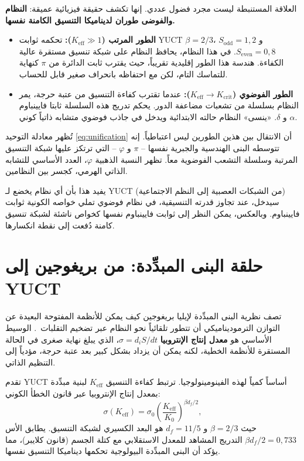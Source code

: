 \documentclass[12pt,a4paper]{article}
\newcommand{\Keff}{K_{\mathrm{eff}}}
\begin{document}
	العلاقة المستنبطة ليست مجرد فضول عددي. إنها تكشف حقيقة فيزيائية عميقة: \textbf{النظام والفوضى طوران لديناميكا التنسيق الكامنة نفسها.}
	
	\begin{itemize}
		\item \textbf{الطور المرتب (\(K_{\mathrm{eff}} \gg 1\)):} تحكمه ثوابت YUCT \(\beta = 2/3\)، \(S_{\mathrm{odd}} = 1{,}2\) و \(S_{\mathrm{even}} = 0{,}8\). في هذا النظام، يحافظ النظام على شبكة تنسيق مستقرة عالية الكفاءة. هندسة هذا الطور إقليدية تقريباً، حيث يقترب ثابت الدائرة من \(\pi\) كنهاية للتماسك التام، لكن مع احتفاظه بانحراف صغير قابل للحساب.
		
		\item \textbf{الطور الفوضوي (\(K_{\mathrm{eff}} \to K_{\mathrm{crit}}\)):} عندما تقترب كفاءة التنسيق من عتبة حرجة، يمر النظام بسلسلة من تشعبات مضاعفة الدور. يحكم تدريج هذه السلسلة ثابتا فايينباوم \(\alpha\) و \(\delta\). «ينسى» النظام حالته الابتدائية ويدخل في جاذب فوضوي متشابه ذاتياً كوني.
	\end{itemize}
	
	تُظهر معادلة التوحيد \eqref{eq:unification} أن الانتقال بين هذين الطورين ليس اعتباطياً. إنه تتوسطه البنى الهندسية والجبرية نفسها – \(\pi\) و \(\varphi\) – التي ترتكز عليها شبكة التنسيق المرتبة وسلسلة التشعب الفوضوية معاً. تظهر النسبة الذهبية \(\varphi\)، العدد الأساسي للتشابه الذاتي الهرمي، كجسر بين النظامين.
	
	يفيد هذا بأن أي نظام يخضع لـ YUCT (من الشبكات العصبية إلى النظم الاجتماعية) سيدخل، عند تجاوز قدرته التنسيقية، في نظام فوضوي تملي خواصه الكونية ثوابت فايينباوم. وبالعكس، يمكن النظر إلى ثوابت فايينباوم نفسها كخواص ناشئة لشبكة تنسيق كامنة دُفعت إلى نقطة انكسارها.
	
	\section{حلقة البنى المبدِّدة: من بريغوجين إلى YUCT}
	\label{sec:prigogine}
	
	تصف نظرية البنى المبدِّدة لإيليا بريغوجين كيف يمكن للأنظمة المفتوحة البعيدة عن التوازن الترموديناميكي أن تتطور تلقائياً نحو النظام عبر تضخيم التقلبات~\cite{Prigogine1977}. الوسيط الأساسي هو \textbf{معدل إنتاج الإنتروبيا} \(\sigma = d_iS/dt\)، الذي يبلغ نهاية صغرى في الحالة المستقرة للأنظمة الخطية، لكنه يمكن أن يزداد بشكل كبير بعد عتبة حرجة، مؤدياً إلى التنظيم الذاتي.
	
	تقدم YUCT أساساً كمياً لهذه الفينومينولوجيا. ترتبط كفاءة التنسيق \(K_{\mathrm{eff}}\) لبنية مبدِّدة بمعدل إنتاج الإنتروبيا عبر قانون الخطأ الكوني:
	\begin{equation}
		\sigma(\Keff) = \sigma_0 \left( \frac{\Keff}{K_0} \right)^{\beta d_f / 2},
		\label{eq:sigma-keff}
	\end{equation}
	حيث \(\beta = 2/3\) و \(d_f = 11/5\) هو البعد الكسيري لشبكة التنسيق. يطابق الأس \(\beta d_f / 2 = 0{,}733\) التدريج المشاهد للمعدل الاستقلابي مع كتلة الجسم (قانون كلايبر)، مما يؤكد أن البنى المبدِّدة البيولوجية تحكمها ديناميكا التنسيق نفسها.
	
\end{document}
